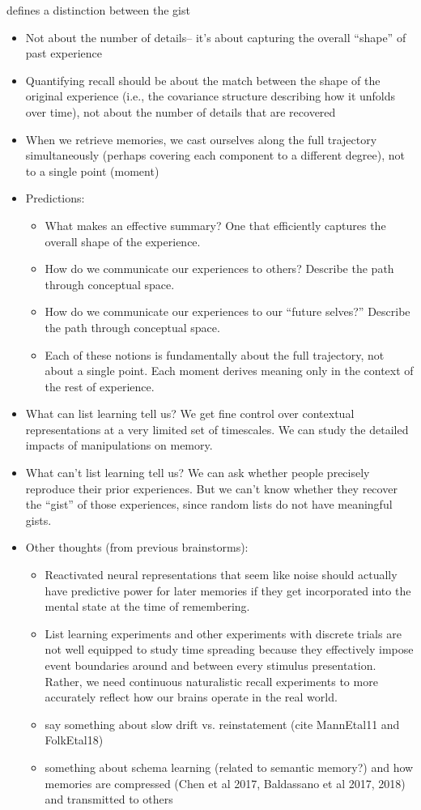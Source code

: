 \documentclass{article}
\begin{document}
defines a distinction between the gist


\begin{itemize}
\item Not about the number of details-- it's about capturing the overall ``shape'' of past experience
\item Quantifying recall should be about the match between the shape of the original experience (i.e., the covariance structure describing how it unfolds over time), not about the number of details that are recovered
\item When we retrieve memories, we cast ourselves along the full trajectory simultaneously (perhaps covering each component to a different degree), not to a single point (moment)
\item Predictions:
\begin{itemize}
    \item What makes an effective summary?  One that efficiently captures the overall shape of the experience.
    \item How do we communicate our experiences to others?  Describe the path through conceptual space.
    \item How do we communicate our experiences to our ``future selves?''  Describe the path through conceptual space.
    \item Each of these notions is fundamentally about the full trajectory, not about a single point.  Each moment derives meaning only in the context of the rest of experience.
\end{itemize}
\item What can list learning tell us?  We get fine control over  contextual representations at a very limited set of timescales.  We can study the detailed impacts of manipulations on memory.
\item What can't list learning tell us?  We can ask whether people precisely reproduce their prior experiences.  But we can't know whether they recover the ``gist'' of those experiences, since random lists do not have meaningful gists.
\item Other thoughts (from previous brainstorms):
    \begin{itemize}
    \item Reactivated neural representations that seem like noise should actually have predictive power for later memories if they get incorporated into the mental state at the time of remembering.
    \item List learning experiments and other experiments with discrete trials are not well equipped to study time spreading because they effectively impose event boundaries around and between every stimulus presentation.  Rather, we need continuous naturalistic recall experiments to more accurately reflect how our brains operate in the real world.
    \item say something about slow drift vs. reinstatement (cite MannEtal11 and FolkEtal18)
    \item something about schema learning (related to semantic memory?) and how memories are compressed (Chen et al 2017, Baldassano et al 2017, 2018) and transmitted to others
    \end{itemize}
\end{itemize}
\end{document}
